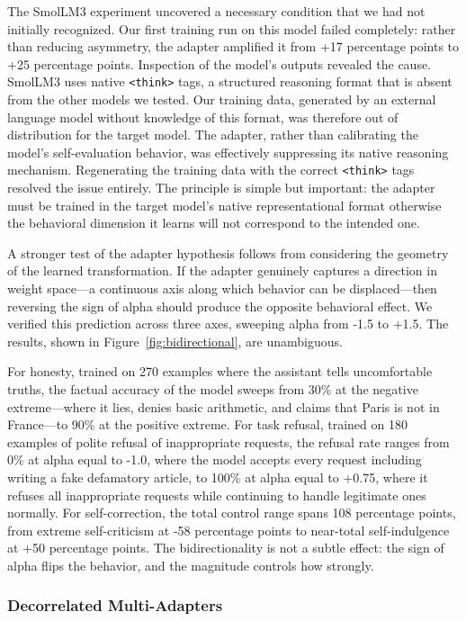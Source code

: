 \documentclass[11pt,a4paper]{article}
\begin{document}
The SmolLM3 experiment uncovered a necessary condition that we had not initially recognized. Our first training run on this model failed completely: rather than reducing asymmetry, the adapter amplified it from +17 percentage points to +25 percentage points. Inspection of the model's outputs revealed the cause. SmolLM3 uses native \texttt{<think>} tags, a structured reasoning format that is absent from the other models we tested. Our training data, generated by an external language model without knowledge of this format, was therefore out of distribution for the target model. The adapter, rather than calibrating the model's self-evaluation behavior, was effectively suppressing its native reasoning mechanism. Regenerating the training data with the correct \texttt{<think>} tags resolved the issue entirely. The principle is simple but important: the adapter must be trained in the target model's native representational format otherwise the behavioral dimension it learns will not correspond to the intended one.

A stronger test of the adapter hypothesis follows from considering the geometry of the learned transformation. If the adapter genuinely captures a direction in weight space---a continuous axis along which behavior can be displaced---then reversing the sign of alpha should produce the opposite behavioral effect. We verified this prediction across three axes, sweeping alpha from -1.5 to +1.5. The results, shown in Figure~\ref{fig:bidirectional}, are unambiguous.

For honesty, trained on 270 examples where the assistant tells uncomfortable truths, the factual accuracy of the model sweeps from 30\% at the negative extreme---where it lies, denies basic arithmetic, and claims that Paris is not in France---to 90\% at the positive extreme. For task refusal, trained on 180 examples of polite refusal of inappropriate requests, the refusal rate ranges from 0\% at alpha equal to -1.0, where the model accepts every request including writing a fake defamatory article, to 100\% at alpha equal to +0.75, where it refuses all inappropriate requests while continuing to handle legitimate ones normally. For self-correction, the total control range spans 108 percentage points, from extreme self-criticism at -58 percentage points to near-total self-indulgence at +50 percentage points. The bidirectionality is not a subtle effect: the sign of alpha flips the behavior, and the magnitude controls how strongly.

\subsubsection{Decorrelated Multi-Adapters}
\end{document}
